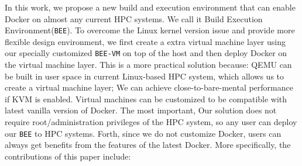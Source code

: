 In this work, we propose a new build and execution environment that can enable Docker on almost any current HPC systems. We call it Build Execution Environment(\texttt{BEE}). To overcome the Linux kernel version issue and provide more flexible design environment, we first create a extra virtual machine layer using our specially customized \texttt{BEE-VM} on top of the host and then deploy Docker on the virtual machine layer. This is a more practical solution because: 
QEMU can be built in user space in current Linux-based HPC system,  which allows us to create a virtual machine layer; 
We can achieve close-to-bare-mental performance if KVM is enabled.
Virtual machines can be customized to be compatible with latest vanilla version of Docker.
The most important, Our solution does not require root/administration privileges of the HPC system, so any user can deploy our \texttt{BEE} to HPC systems. Forth, since we do not customize Docker, users can always get benefits from the features of the latest Docker. More specifically, the contributions of this paper include:

